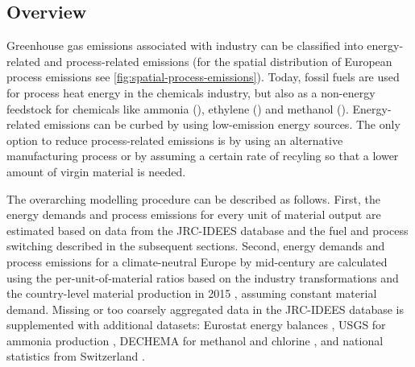 \subsection{Overview}
\label{sec:si:industry:overview}

Greenhouse gas emissions associated with industry can be classified into
energy-related and process-related emissions (for the spatial distribution of
European process emissions see \cref{fig:spatial-process-emissions}). Today,
fossil fuels are used for process heat energy in the chemicals industry, but
also as a non-energy feedstock for chemicals like ammonia (), ethylene
() and methanol (). Energy-related emissions can be curbed by
using low-emission energy sources. The only option to reduce process-related
emissions is by using an alternative manufacturing process or by assuming a
certain rate of recyling so that a lower amount of virgin material is needed.

The overarching modelling procedure can be described as follows. First, the
energy demands and process emissions for every unit of material output are
estimated based on data from the JRC-IDEES
database 
and the fuel and process switching described in the subsequent sections. Second,
energy demands and process emissions for a climate-neutral Europe by mid-century
are calculated using the per-unit-of-material ratios based on the industry
transformations and the country-level material production in
2015 ,
assuming constant material demand. Missing or too coarsely aggregated data in
the JRC-IDEES
database  is
supplemented with additional datasets: Eurostat energy
balances , USGS for ammonia
production , DECHEMA for
methanol and chlorine , and national statistics from
Switzerland .

